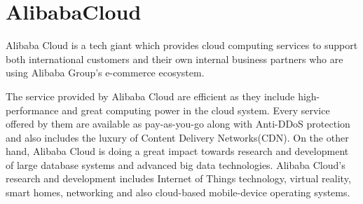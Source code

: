 \section{AlibabaCloud}

Alibaba Cloud is a tech giant which provides cloud computing services to support
both international customers and their own internal business partners who are
using Alibaba Group's e-commerce ecosystem.


The service provided by Alibaba Cloud are efficient as they include
high-performance and great computing power in the cloud system. Every service
offered by them are available as pay-as-you-go along with Anti-DDoS protection
and also includes the luxury of Content Delivery Networks(CDN). On the other
hand, Alibaba Cloud is doing a great impact towards research and development of
large database systems and advanced big data technologies. Alibaba Cloud's
research and development includes Internet of Things technology, virtual
reality, smart homes, networking and also cloud-based mobile-device
operating systems. \cite{AlibabaCloud}


